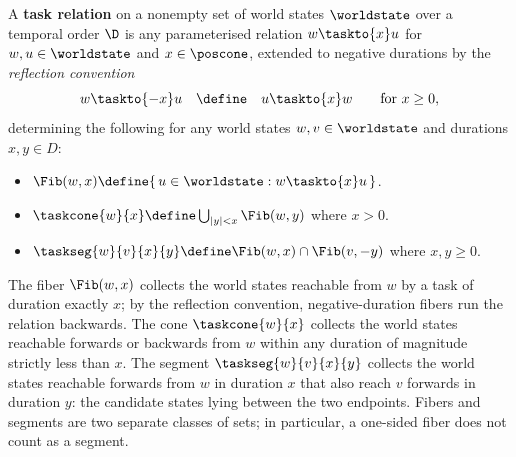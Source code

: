 \documentclass[../BimodalReference.tex]{subfiles}
\begin{document}
\begin{definition}\label{def:task-relation}
A \textbf{task relation} on a nonempty set of world states $\worldstate$ over a temporal order $\D$ is any parameterised relation $w \taskto{x} u$ for $w, u \in \worldstate$ and $x \in \poscone$, extended to negative durations by the \emph{reflection convention}
\[
  w \taskto{-x} u \quad \define \quad u \taskto{x} w
  \qquad \text{for } x \geq 0,
\]
determining the following for any world states $w, v \in \worldstate$ and durations $x, y \in D$:
\begin{itemize}
  \item[\emph{Fiber}:] $\Fib(w, x) \define \{\, u \in \worldstate : w \taskto{x} u \,\}$.
  \item[\emph{Cone}:] $\taskcone{w}{x} \define \bigcup_{|y| < x} \Fib(w, y)$ where $x > 0$.
  \item[\emph{Segment}:] $\taskseg{w}{v}{x}{y} \define \Fib(w, x) \cap \Fib(v, -y)$ where $x, y \geq 0$.
\end{itemize}
\end{definition}

\noindent
The fiber $\Fib(w, x)$ collects the world states reachable from $w$ by a task of duration exactly $x$; by the reflection convention, negative-duration fibers run the relation backwards.
The cone $\taskcone{w}{x}$ collects the world states reachable forwards or backwards from $w$ within any duration of magnitude strictly less than $x$.
The segment $\taskseg{w}{v}{x}{y}$ collects the world states reachable forwards from $w$ in duration $x$ that also reach $v$ forwards in duration $y$: the candidate states lying between the two endpoints.
Fibers and segments are two separate classes of sets; in particular, a one-sided fiber does not count as a segment.
\end{document}
